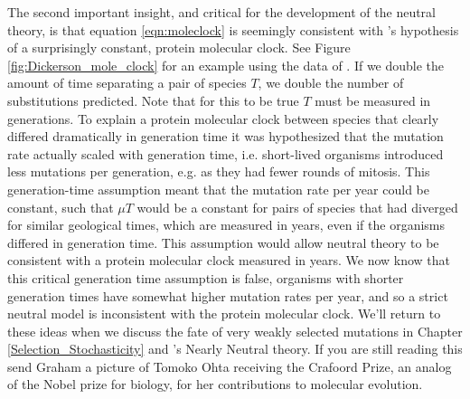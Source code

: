 The second important insight, and critical for the development of the neutral theory, is that equation \eqref{eqn:moleclock} is seemingly consistent with \citet{zuckerkandl1965evolutionary}'s hypothesis of a surprisingly constant, protein molecular clock. See Figure \ref{fig:Dickerson_mole_clock} for an example using the data of \citet{dickerson1971structure}. If we double the amount of time separating a pair of species $T$, we double the number of substitutions predicted. Note that for this to be true $T$ must be measured in generations. To explain a protein molecular clock between species that clearly differed dramatically in generation time it was hypothesized that the mutation rate actually scaled with generation time, i.e. short-lived organisms introduced less mutations per generation, e.g. as they had fewer rounds of mitosis. This generation-time assumption meant that the mutation rate per year could be constant, such that $\mu T$ would be a constant for pairs of species that had diverged for similar geological times, which are measured in years, even if the organisms differed in generation time. This assumption would allow neutral theory to be consistent with a protein molecular clock measured in years. We now know that this critical generation time assumption is false, organisms with shorter generation times have somewhat higher mutation rates per year, and so a strict neutral model is inconsistent with the protein molecular clock. We'll return to these ideas when we discuss the fate of very weakly selected mutations in Chapter \ref{Selection_Stochasticity} and \citet{ohta1973slightly}'s Nearly Neutral theory. If you are still reading this send Graham a picture of Tomoko Ohta receiving the Crafoord Prize, an analog of the Nobel prize for biology, for her contributions to molecular evolution. 




